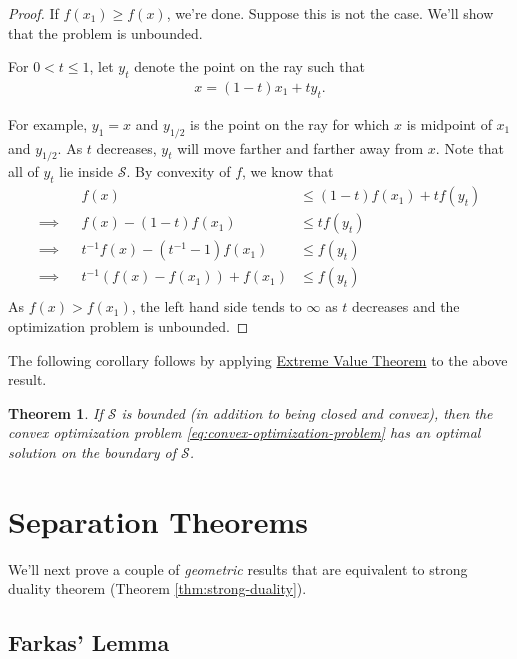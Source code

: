 \documentclass[
]{book}
\newtheorem{theorem}{Theorem}[chapter]
\theoremstyle{definition}
\theoremstyle{definition}
\theoremstyle{definition}
\theoremstyle{definition}
\theoremstyle{remark}
\begin{document}
\begin{proof}
If \(f(x_1) \ge f(x)\), we're done. Suppose this is not the case. We'll show that the problem is unbounded.

For \(0 < t \le 1\), let \({y}_t\) denote the point on the ray such that
\begin{align*}
  {x} = (1-t) {x}_1 + t {y}_t.
\end{align*}

For example, \({y}_1 = {x}\) and \({y}_{1/2}\) is the point on the ray for which \({x}\) is midpoint of \({x}_1\) and \({y}_{1/2}\). As \(t\) decreases, \({y}_t\) will move farther and farther away from \({x}\). Note that all of \({y}_t\) lie inside \(\mathcal{S}\). By convexity of \(f\), we know that
\begin{align*}
  && f({x}) & \le (1-t) f({x}_1) + t f({y}_  t) \\
\implies && f({x}) - (1-t) f({x}_1) &\le t f({y}_t) \\
\implies && t^{-1}f({x}) - (t^{-1}-1) f({x}_1) &\le f({y}_t) \\
\implies && t^{-1}(f({x}) - f({x}_1)) + f({x}_1) &\le f({y}_t) \\
\end{align*}
As \(f({x}) > f({x}_1)\), the left hand side tends to \(\infty\) as \(t\) decreases and the optimization problem is unbounded.
\end{proof}

The following corollary follows by applying \href{https://en.wikipedia.org/wiki/Extreme_value_theorem}{Extreme Value Theorem} to the above result.

\begin{theorem}
If \(\mathcal{S}\) is bounded (in addition to being closed and convex), then the convex optimization problem \eqref{eq:convex-optimization-problem} has an optimal solution on the boundary of \(\mathcal{S}\).
\end{theorem}

\hypertarget{separation-theorems}{%
\chapter{Separation Theorems}\label{separation-theorems}}

We'll next prove a couple of \emph{geometric} results that are equivalent to strong duality theorem (Theorem \ref{thm:strong-duality}).

\hypertarget{farkas-lemma}{%
\section{Farkas' Lemma}\label{farkas-lemma}}
\end{document}
